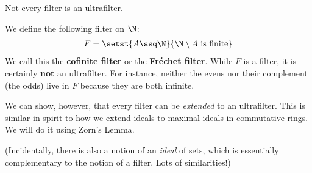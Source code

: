Not every filter is an ultrafilter.

\begin{boxcexample}
    We define the following filter on $\N$:
    \begin{align*}
        F = \setst{A \ssq \N}{\N \setminus A \text{ is finite}}
    \end{align*}
    We call this the \textbf{cofinite filter} or the \textbf{Fréchet filter}. While $F$ is a filter, it is certainly \textbf{not} an ultrafilter. For instance, neither the evens nor their complement (the odds) live in $F$ because they are both infinite.
\end{boxcexample}

We can show, however, that every filter can be \textit{extended} to an ultrafilter. This is similar in spirit to how we extend ideals to maximal ideals in commutative rings. We will do it using Zorn's Lemma.

(Incidentally, there is also a notion of an \textit{ideal} of sets, which is essentially complementary to the notion of a filter. Lots of similarities!)